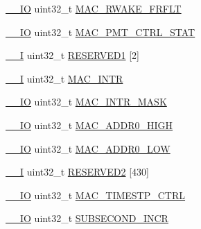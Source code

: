 \begin{DoxyCompactItemize}
\item 
\hyperlink{core__sc300_8h_aec43007d9998a0a0e01faede4133d6be}{\+\_\+\+\_\+\+IO} uint32\+\_\+t \hyperlink{struct_l_p_c___e_n_e_t___t_a44f6c4f404cd481274926b708660634f}{M\+A\+C\+\_\+\+R\+W\+A\+K\+E\+\_\+\+F\+R\+F\+LT}
\item 
\hyperlink{core__sc300_8h_aec43007d9998a0a0e01faede4133d6be}{\+\_\+\+\_\+\+IO} uint32\+\_\+t \hyperlink{struct_l_p_c___e_n_e_t___t_aac7ba45d55fa066415d2fc535c5db328}{M\+A\+C\+\_\+\+P\+M\+T\+\_\+\+C\+T\+R\+L\+\_\+\+S\+T\+AT}
\item 
\hyperlink{core__sc300_8h_af63697ed9952cc71e1225efe205f6cd3}{\+\_\+\+\_\+I} uint32\+\_\+t \hyperlink{struct_l_p_c___e_n_e_t___t_ac356cf3c1afcb7c47521aaa66a673803}{R\+E\+S\+E\+R\+V\+E\+D1} \mbox{[}2\mbox{]}
\item 
\hyperlink{core__sc300_8h_af63697ed9952cc71e1225efe205f6cd3}{\+\_\+\+\_\+I} uint32\+\_\+t \hyperlink{struct_l_p_c___e_n_e_t___t_a4b46a9463954717d3e3d6a0ddc301d8c}{M\+A\+C\+\_\+\+I\+N\+TR}
\item 
\hyperlink{core__sc300_8h_aec43007d9998a0a0e01faede4133d6be}{\+\_\+\+\_\+\+IO} uint32\+\_\+t \hyperlink{struct_l_p_c___e_n_e_t___t_a55a30608c59e8475fcba709cd0834317}{M\+A\+C\+\_\+\+I\+N\+T\+R\+\_\+\+M\+A\+SK}
\item 
\hyperlink{core__sc300_8h_aec43007d9998a0a0e01faede4133d6be}{\+\_\+\+\_\+\+IO} uint32\+\_\+t \hyperlink{struct_l_p_c___e_n_e_t___t_a748ffff01983993664898576e0587494}{M\+A\+C\+\_\+\+A\+D\+D\+R0\+\_\+\+H\+I\+GH}
\item 
\hyperlink{core__sc300_8h_aec43007d9998a0a0e01faede4133d6be}{\+\_\+\+\_\+\+IO} uint32\+\_\+t \hyperlink{struct_l_p_c___e_n_e_t___t_a256bb96efb649356fd45f3de991c25cf}{M\+A\+C\+\_\+\+A\+D\+D\+R0\+\_\+\+L\+OW}
\item 
\hyperlink{core__sc300_8h_af63697ed9952cc71e1225efe205f6cd3}{\+\_\+\+\_\+I} uint32\+\_\+t \hyperlink{struct_l_p_c___e_n_e_t___t_a5e5a69d521b704cd4d362c23f01461ed}{R\+E\+S\+E\+R\+V\+E\+D2} \mbox{[}430\mbox{]}
\item 
\hyperlink{core__sc300_8h_aec43007d9998a0a0e01faede4133d6be}{\+\_\+\+\_\+\+IO} uint32\+\_\+t \hyperlink{struct_l_p_c___e_n_e_t___t_a14479746efbc74752b80e1cce155352f}{M\+A\+C\+\_\+\+T\+I\+M\+E\+S\+T\+P\+\_\+\+C\+T\+RL}
\item 
\hyperlink{core__sc300_8h_aec43007d9998a0a0e01faede4133d6be}{\+\_\+\+\_\+\+IO} uint32\+\_\+t \hyperlink{struct_l_p_c___e_n_e_t___t_ad757d8c4e9bc4e43ca20a700c32c0063}{S\+U\+B\+S\+E\+C\+O\+N\+D\+\_\+\+I\+N\+CR}
\item 

\end{DoxyCompactItemize}
